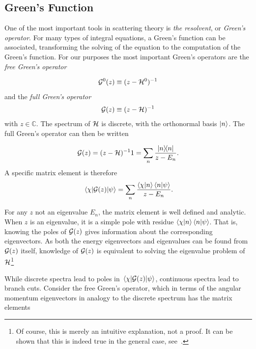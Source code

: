\subsection{Green's Function}
One of the most important tools in scattering theory is \textit{the resolvent},
or \textit{Green's operator}. For many types of integral equations, a Green's
function can be associated, transforming the solving of the equation to the
computation of the Green's function. For our purposes the most important Green's
operators are the \textit{free Green's operator}

\begin{equation*}
  \mathcal{G}^{0}(z) \equiv (z-\mathcal{H}^{0})^{-1}
\end{equation*}
and the \textit{full Green's operator}
\begin{equation*}
  \mathcal{G}(z) \equiv (z-\mathcal{H})^{-1}
\end{equation*}
with \(z\in\mathbb{C}\). The spectrum of
\(\mathcal{H}\) is discrete, with the orthonormal basis \({\ket{n}}\). The full
Green's operator can then be written

\begin{equation*}
  \mathcal{G}(z) = (z-\mathcal{H})^{-1}1 = \sum_{n}\frac{\op{n}}{z-E_{n}}.
\end{equation*}
A specific matrix element is therefore
\begin{equation*}
  \mel{\chi}{\oop{G}(z)}{\psi} =\sum_{n} \frac{\ip{\chi}{n}\ip{n}{\psi}}{z-E_{n}}.
\end{equation*}
\newcommand{\gop}{\oop{G}(z)}
\newcommand{\mgop}{\(\oop{G}(z)\)}

For any \(z\) not an eigenvalue \(E_{n}\), the matrix element is well defined and
analytic. When \(z\) is an eigenvalue, it is a simple pole with residue
\(\ip{\chi}{n}\ip{n}{\psi}\). That is, knowing the poles of \(\mathcal{G}(z)\) gives
information about the corresponding eigenvectors. As both the energy
eigenvectors and eigenvalues can be found from \mgop{} itself, knowledge of
\mgop{} is equivalent to solving the eigenvalue problem of
\(\mathcal{H}\)\footnote{Of course, this is merely an intuitive explanation, not a
  proof. It can be shown that this is indeed true in the general case, see~\cite[p.~131]{taylor}.}

While discrete spectra lead to poles in \(\mel{\chi}{\gop{}}{\psi}\), continuous spectra lead to 
branch cuts. Consider the free Green's operator, which in terms of the angular
momentum eigenvectors in analogy to the discrete spectrum has the matrix elements

